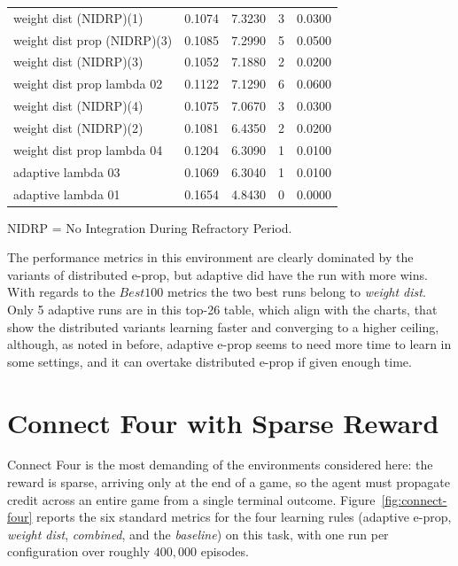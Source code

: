 \begin{table}[H]
\begin{tabular}{l r r r r}
weight dist (NIDRP)(1)            & 0.1074 & 7.3230 & 3  & 0.0300 \\
weight dist prop (NIDRP)(3)       & 0.1085 & 7.2990 & 5  & 0.0500 \\
weight dist (NIDRP)(3)            & 0.1052 & 7.1880 & 2  & 0.0200 \\
weight dist prop lambda 02        & 0.1122 & 7.1290 & 6  & 0.0600 \\
weight dist (NIDRP)(4)            & 0.1075 & 7.0670 & 3  & 0.0300 \\
weight dist (NIDRP)(2)            & 0.1081 & 6.4350 & 2  & 0.0200 \\
weight dist prop lambda 04        & 0.1204 & 6.3090 & 1  & 0.0100 \\
adaptive lambda 03                & 0.1069 & 6.3040 & 1  & 0.0100 \\
adaptive lambda 01                & 0.1654 & 4.8430 & 0  & 0.0000 \\
\hline
\end{tabular}
\vspace{2mm}
\footnotesize{NIDRP = No Integration During Refractory Period.}
\end{table}

The performance metrics in this environment are clearly dominated by the variants of distributed e-prop, but adaptive did have the run with more wins. With regards to the $Best100$ metrics the two best runs belong to \emph{weight dist}. Only 5 adaptive runs are in this top-26 table, which align with the charts, that show the distributed variants learning faster and converging to a higher ceiling, although, as noted in before, adaptive e-prop seems to need more time to learn in some settings, and it can overtake distributed e-prop if given enough time.

\clearpage
\section{Connect Four with Sparse Reward}
\label{sec:connect_four}

Connect Four is the most demanding of the environments considered here: the reward is sparse,
arriving only at the end of a game, so the agent must propagate credit across an entire game from a
single terminal outcome. Figure~\ref{fig:connect-four} reports the six standard metrics for the four
learning rules (adaptive e-prop, \emph{weight dist}, \emph{combined}, and the \emph{baseline}) on
this task, with one run per configuration over roughly $400{,}000$ episodes.

